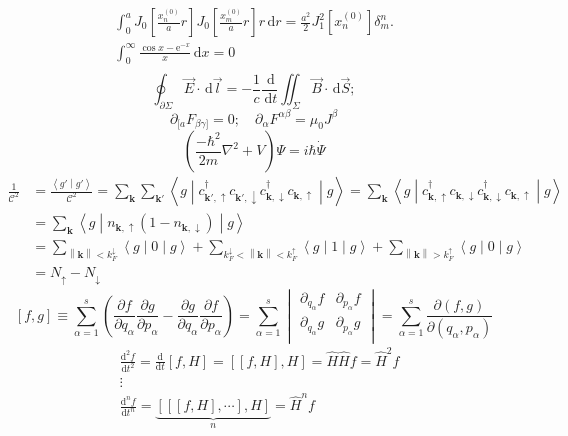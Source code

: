 \documentclass[11pt]{article}
\def\ee{\mathrm{e}}
\def\bm{\symbf}
\newcommand{\innerprod}[2]{\left\langle{#1}\middle\vert{#2}\right\rangle}
\newcommand{\brakket}[3]{\left\langle{#1}\middle\vert{#2}\middle\vert{#3}\right\rangle}
\newcommand{\dd}{\,\mathrm{d}}
\newcommand{\norm}[1]{\left\lVert{#1}\right\rVert}
\begin{document}
\begin{align*}
\int_{0}^aJ_0\left[\frac{x_n^{(0)}}{a}r\right]J_0\left[\frac{x_m^{(0)}}{a}r\right]r\dd{r}=\frac{a^2}{2}J_1^2[x_n^{(0)}]\delta_m^n.\\
\int_{0}^{\infty}\frac{\cos x-\ee^{-x}}{x}\dd{x}=0\\
\end{align*}
\[\oint_{\partial\Sigma}\vec E\cdot \dd{\vec{l}}=-\frac{1}{c}\frac{\dd}{\dd t}\iint_{\Sigma}\vec B \cdot \dd{\vec{S}};\]
\[\partial_{[a}F_{\beta\gamma]}=0;\quad \partial_\alpha F^{\alpha\beta}=\mu_0J^\beta\]
\[\left(\frac{-\hbar^2}{2m}\nabla^2+V\right)\Psi=i\hbar\dot{\Psi}\]
\[\begin{split}
\frac{1}{\mathcal{C}^2}&{}=\frac{\innerprod{g'}{g'}}{\mathcal{C}^2}=\sum_{\bm{k}}\sum_{\bm{k}'}\brakket{g}{c_{\bm{k}',\uparrow}^\dagger c_{\bm{k}',\downarrow} c_{\bm{k},\downarrow}^\dagger c_{\bm{k},\uparrow}}{g}=\sum_{\bm{k}}\brakket{g}{c_{\bm{k},\uparrow}^\dagger c_{\bm{k},\downarrow} c_{\bm{k},\downarrow}^\dagger c_{\bm{k},\uparrow}}{g}\\
&{}=\sum_{\bm{k}}\brakket{g}{n_{\bm{k},\uparrow}\left(1-n_{\bm{k},\downarrow}\right)}{g}\\
&{}=\sum_{\norm{\bm{k}}<k_F^\downarrow}\brakket{g}{0}{g}+\sum_{k_F^\downarrow<\norm{\bm{k}}<k_F^\uparrow}\brakket{g}{1}{g}+\sum_{\norm{\bm{k}}>k_F^\uparrow}\brakket{g}{0}{g}\\
&{}=N_\uparrow-N_\downarrow
\end{split}\]
\[\left[ f,g \right]\equiv \sum_{\alpha =1}^{s}{\left( \frac{\partial f}{\partial {{q}_{\alpha }}}\frac{\partial g}{\partial {{p}_{\alpha }}}-\frac{\partial g}{\partial {{q}_{\alpha }}}\frac{\partial f}{\partial {{p}_{\alpha }}} \right)}=\sum\limits_{\alpha =1}^{s}{\begin{vmatrix}
	\partial_{{q}_{\alpha }} f & \partial_{{p}_{\alpha }} f  \\
	\partial_{{q}_{\alpha }} g & \partial_{{p}_{\alpha }} g  \\
	\end{vmatrix} }=\sum\limits_{\alpha =1}^{s}{\frac{\partial \left( f,g \right)}{\partial \left( {{q}_{\alpha }},{{p}_{\alpha }} \right)}}\]
\[\begin{split}
& \frac{{{\text{d}}^{2}}f}{\text{d}{{t}^{2}}}=\frac{\text{d}}{\text{d}t}\left[ f,H \right]=\left[ \left[ f,H \right],H \right]=\hat{H}\hat{H}f={{{\hat{H}}}^{2}}f \\ 
& \vdots  \\ 
& \frac{{{\text{d}}^{n}}f}{\text{d}{{t}^{n}}}=\underbrace{\left[ \left[ \left[ f,H \right],\cdots  \right],H \right]}_{n}={{{\hat{H}}}^{n}}f  \\
\end{split}\]
\end{document}
